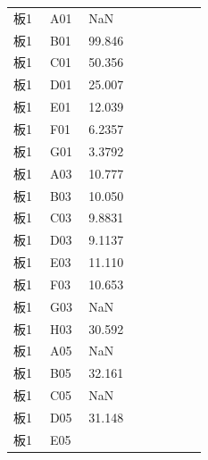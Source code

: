 \documentclass[UTF8,10pt,a4paper,fontset=fandol]{ctexart}
\newcommand{\fieldvalue}[1]{#1}
\begin{document}
\begin{tabular}{@{}p{0.17\linewidth}p{0.18\linewidth}p{0.55\linewidth}@{}}
板1 & A01 &
\fieldvalue{NaN}
\\
板1 & B01 &
\fieldvalue{99.846}
\\
板1 & C01 &
\fieldvalue{50.356}
\\
板1 & D01 &
\fieldvalue{25.007}
\\
板1 & E01 &
\fieldvalue{12.039}
\\
板1 & F01 &
\fieldvalue{6.2357}
\\
板1 & G01 &
\fieldvalue{3.3792}
\\
板1 & A03 &
\fieldvalue{10.777}
\\
板1 & B03 &
\fieldvalue{10.050}
\\
板1 & C03 &
\fieldvalue{9.8831}
\\
板1 & D03 &
\fieldvalue{9.1137}
\\
板1 & E03 &
\fieldvalue{11.110}
\\
板1 & F03 &
\fieldvalue{10.653}
\\
板1 & G03 &
\fieldvalue{NaN}
\\
板1 & H03 &
\fieldvalue{30.592}
\\
板1 & A05 &
\fieldvalue{NaN}
\\
板1 & B05 &
\fieldvalue{32.161}
\\
板1 & C05 &
\fieldvalue{NaN}
\\
板1 & D05 &
\fieldvalue{31.148}
\\
板1 & E05 &

\end{tabular}
\end{document}
